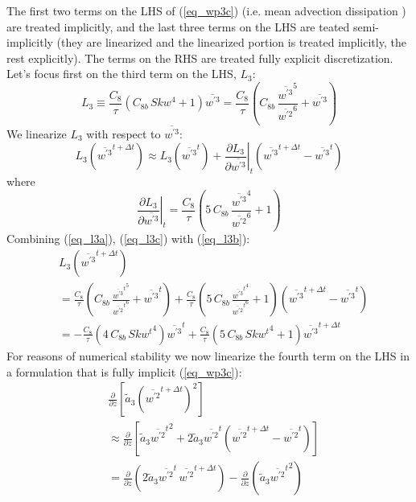 \documentclass[11pt,fleqn]{article}
\newcommand{\ptlder}[2]{\frac{\partial #1}{\partial #2}}
\begin{document}
The first two terms on the LHS of (\ref{eq_wp3c}) (i.e. mean advection dissipation )
are treated implicitly, and
the last three terms on the LHS are teated semi-implicitly (they are linearized
and the linearized portion is treated implicitly, the rest explicitly).
The terms on the RHS are treated fully explicit discretization. Let's focus first on the third term on the LHS, 
$L_3$:
%
\begin{equation}
\label{eq_l3a}
L_3
\equiv \frac{C_8}{\tau}\left( C_{8b} \, Skw^4 + 1 \right) \overline{w^{'3}}
=   \frac{C_8}{\tau}
    \left(  C_{8b} \, \frac{\overline{w^{'3}}^5}{\overline{w^{'2}}^6}
          + \overline{w^{'3}}
    \right)
\end{equation}
%
We linearize $L_3$ with respect to $\overline{w^{'3}}$:
%
\begin{equation}
\label{eq_l3b}
L_3 \left( \overline{w^{'3}}^{t+\Delta t} \right)
\approx L_3 \left( \overline{w^{'3}}^{t} \right)
+ \left. \ptlder{L_3}{\overline{w^{'3}}} \right|_{t}
  \left( \overline{w^{'3}}^{t+\Delta t} - \overline{w^{'3}}^{t} \right)
\end{equation}
%
where
%
\begin{equation}
\label{eq_l3c}
\left. \ptlder{L_3}{\overline{w^{'3}}} \right|_{t}
=   \frac{C_8}{\tau}
    \left(  5 \, C_{8b} \, \frac{\overline{w^{'3}}^4}{\overline{w^{'2}}^6}
          + 1
    \right)
\end{equation}
%
Combining (\ref{eq_l3a}), (\ref{eq_l3c}) with (\ref{eq_l3b}):
%
\begin{equation}
\label{eq_l3d}
\begin{split}
& L_3 \left( \overline{w^{'3}}^{t+\Delta t} \right) \\
&=   \frac{C_8}{\tau}
      \left(  C_{8b} \, \frac{{\overline{w^{'3}}^t}^5}{{\overline{w^{'2}}^t}^6}
            + \overline{w^{'3}}^t
      \right)
   + \frac{C_8}{\tau}
     \left(  5 \, C_{8b} \, \frac{{\overline{w^{'3}}^t}^4}{{\overline{w^{'2}}^t}^6}
           + 1
     \right)
     \left( \overline{w^{'3}}^{t + \Delta t} - \overline{w^{'3}}^t \right)  \\
&= - \frac{C_8}{\tau}
      \left(  4 \, C_{8b} \, {Skw^t}^4 \right) \overline{w^{'3}}^t
   + \frac{C_8}{\tau}
     \left(  5 \, C_{8b} \, {Skw^t}^4 + 1 \right)
      \overline{w^{'3}}^{t + \Delta t}
\end{split}
\end{equation}
%
For reasons of numerical stability we now linearize the fourth term on the LHS 
in a formulation that is fully implicit
(\ref{eq_wp3c}):
%
\begin{equation}
\label{eq_l4a}
\begin{split}
& \ptlder{}{z} \left[ \tilde{a}_3 \left(\overline{w^{'2}}^{t+\Delta t}\right)^2 \right] \\
&\approx  \ptlder{}{z} 
    \left[
      \tilde{a}_3 {\overline{w^{'2}}^t}^2
      + 2 \tilde{a}_3 \overline{w^{'2}}^t
              \left( \overline{w^{'2}}^{t+\Delta t} - \overline{w^{'2}}^{t} \right) 
    \right] \\
&= \ptlder{}{z} \left( 2 \tilde{a}_3 \overline{w^{'2}}^t \, \overline{w^{'2}}^{t+\Delta t} \right)
 - \ptlder{}{z} \left( \tilde{a}_3 {\overline{w^{'2}}^t}^2 \right)
\end{split}
\end{equation}
\end{document}
